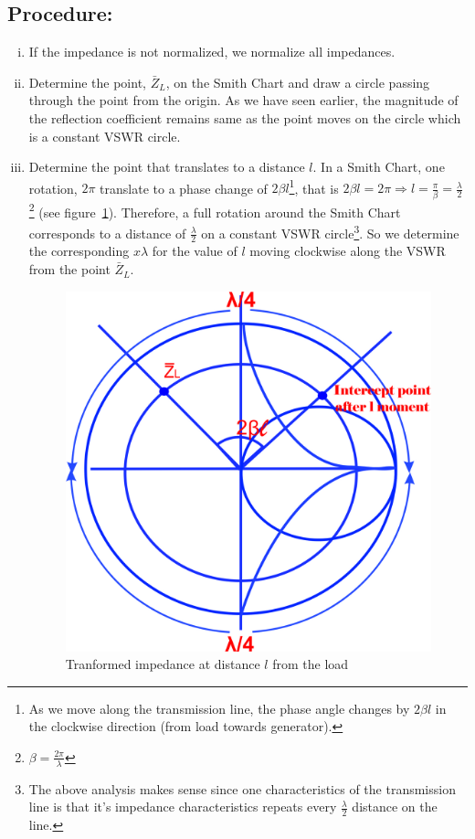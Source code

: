 \subsection*{Procedure:}
\begin{enumerate}[(i)]
\item If the impedance is not normalized, we normalize all impedances.
\item Determine the point, $\bar{Z}_L$, on the Smith Chart and draw a circle passing through the point from the origin. As we have seen earlier, the magnitude of the reflection coefficient remains same as the point moves on the circle which is a constant VSWR circle.
\item Determine the point that translates to a distance $l$. In a Smith Chart, one rotation, $2\pi$ translate to a phase change of $2\beta{l}$\footnote{
As we move along the transmission line, the phase angle changes by $2\beta{l}$ in the clockwise direction (from load towards generator).
}, that is $2\beta{l} = 2\pi\Longrightarrow l = \frac{\pi}{\beta} = \frac{\lambda}{2}$\footnote{
$\beta = \frac{2\pi}{\lambda}$
} (see figure~\ref{fig:mjhtre}). Therefore, a full rotation around the Smith Chart corresponds to a distance of $\frac{\lambda}{2}$ on a constant VSWR circle\footnote{
The above analysis makes sense since one characteristics of the transmission line is that it's impedance characteristics repeats every $\frac{\lambda}{2}$ distance on the line.
}. So we determine the corresponding $x\lambda$ for the value of $l$ moving clockwise along the VSWR from the point $\bar{Z}_L$.
\begin{figure}[h]
\centering
\includegraphics[width=0.7\linewidth]{./graphics/mjhtre}
\caption{Tranformed impedance at distance $l$ from the load}
\label{fig:mjhtre}
\end{figure}


\end{enumerate}
